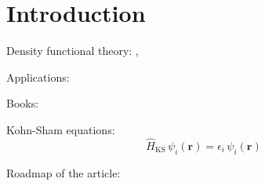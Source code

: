 \section{Introduction}

Density functional theory: \cite{Hohenberg1964,Kohn1965},

Applications: \cite{VanMourik2014}

Books: \cite{Martin2004,Kohanoff2006,Marx2009}

Kohn-Sham equations:
\begin{equation}
\hat{H}_{\mathrm{KS}}\,\psi_{i}(\mathbf{r}) = \epsilon_{i}\,\psi_{i}(\mathbf{r})
\end{equation}

Roadmap of the article: